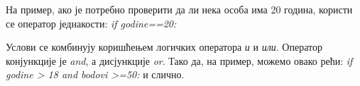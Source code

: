 На пример, ако је потребно проверити да ли нека особа има 20 година, користи се оператор једнакости: \emph{if godine==20:}

Услови се комбинују коришћењем логичких оператора \emph{и} и \emph{или}. Оператор конјункције је \emph{and}, а дисјункције \emph{or}. Тако да, на пример, можемо овако рећи: \emph{if godine > 18 and bodovi >=50:} и слично.
